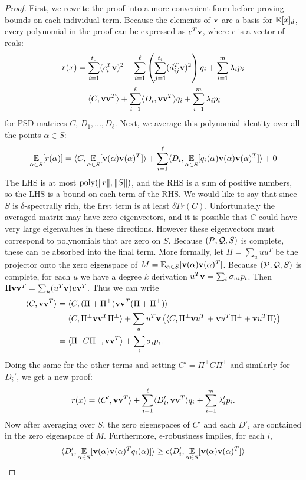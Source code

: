 \begin{proof}
First, we rewrite the proof into a more convenient form before proving bounds on each individual term. Because the elements of ${\bf v}$ are a basis for $\mathbb R[x]_d$, every polynomial in the proof can be expressed as $c^T{\bf v}$, where $c$ is a vector of reals:
\begin{align*} r(x) &= \sum_{i=1}^{t_0} (c_i^T{\bf v})^2 + \sum_{i=1}^\ell \left(\sum_{j=1}^{t_i} (d_{ij}^T{\bf v})^2\right)q_i + \sum_{i=1}^m \lambda_i p_i \\
&= \langle C, {\bf v}{\bf v}^T\rangle + \sum_{i=1}^\ell \langle D_i, {\bf v}{\bf v}^T\rangle q_i + \sum_{i=1}^m \lambda_i p_i
\end{align*}
for PSD matrices $C$, $D_1,\dots,D_\ell$. Next, we average this polynomial identity over all the points $\alpha \in S$:
\begin{align*}
\operatorname*{\mathbb{E}}_{\alpha \in S}[r(\alpha)] &= \langle C, \operatorname*{\mathbb{E}}_{\alpha \in S}[{\bf v}(\alpha){\bf v}(\alpha)^T]\rangle + \sum_{i=1}^\ell \langle D_i, \operatorname*{\mathbb{E}}_{\alpha \in S}[q_i(\alpha){\bf v}(\alpha){\bf v}(\alpha)^T]\rangle + 0 \\
\end{align*}
The LHS is at most $\operatorname{poly}(\|r\|, \|S\|)$, and the RHS is a sum of positive numbers, so the LHS is a bound on each term of the RHS. 
%
We would like to say that since $S$ is $\delta$-spectrally rich, the first term is at least $\delta Tr(C)$. 
%
Unfortunately the averaged matrix may have zero eigenvectors, and it is possible that $C$ could have very large eigenvalues in these directions. 
%
However these eigenvectors must correspond to polynomials that are zero on $S$. Because $(\mathcal P, \mathcal Q, S)$ is complete, these can be absorbed into the final term. More formally, let $\Pi = \sum_u uu^T$ be the projector onto the zero eigenspace of $M = \operatorname*{\mathbb{E}}_{\alpha \in S}[{\bf v}(\alpha){\bf v}(\alpha)^T]$. Because $(\mathcal P, \mathcal Q, S)$ is complete, for each $u$ we have a degree $k$ derivation $u^T{\bf v} = \sum_i \sigma_{ui} p_i$. Then $\Pi {\bf v}{\bf v}^T = \sum_u (u^T{\bf v}) u{\bf v}^T$. Thus we can write
\begin{align*}
\langle C, {\bf v}{\bf v}^T\rangle &= \langle C, (\Pi + \Pi^\perp){\bf v}{\bf v}^T(\Pi + \Pi^\perp)\rangle \\
&= \langle C, \Pi^\perp {\bf v}{\bf v}^T \Pi^\perp\rangle + \sum_u u^T{\bf v}\left(\langle C, \Pi^\perp {\bf v}u^T + {\bf v}u^T\Pi^\perp + {\bf v}u^T\Pi\rangle\right) \\
&= \langle \Pi^\perp C \Pi^\perp, {\bf v}{\bf v}^T\rangle + \sum_i \sigma_i p_i.
\end{align*}
Doing the same for the other terms and setting $C' = \Pi^\perp C \Pi^\perp$ and similarly for $D_i'$, we get a new proof:
\[r(x) = \langle C', {\bf v}{\bf v}^T\rangle + \sum_{i=1}^\ell \langle D_i', {\bf v}{\bf v}^T\rangle q_i + \sum_{i=1}^m \lambda_i' p_i.\]
Now after averaging over $S$, the zero eigenspaces of $C'$ and each $D'_i$ are contained in the zero eigenspace of $M$. Furthermore, $\epsilon$-robustness implies, for each $i$,
\[\langle D_i', \operatorname*{\mathbb{E}}_{\alpha \in S}[{\bf v}(\alpha){\bf v}(\alpha)^Tq_i(\alpha)] \rangle \geq \epsilon\langle D_i', \operatorname*{\mathbb{E}}_{\alpha \in S}[{\bf v}(\alpha){\bf v}(\alpha)^T]\rangle\]


\end{proof}
